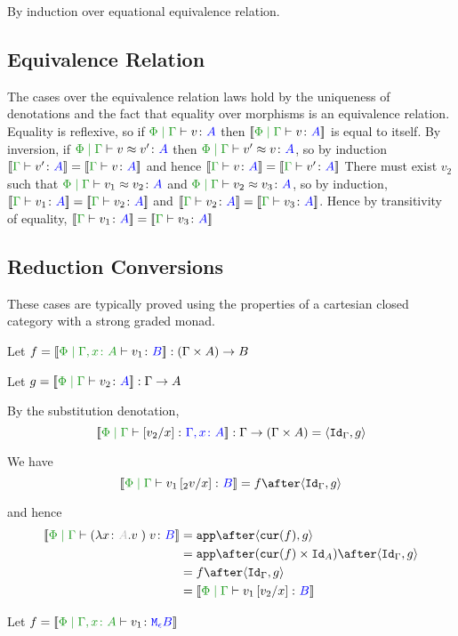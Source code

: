 \documentclass{report}
\begin{document}
By induction over equational equivalence relation.
\subsection{Equivalence Relation}
The cases over the equivalence relation laws hold by the uniqueness of denotations and the fact that equality over morphisms is an equivalence relation.
Equality is reflexive, so if $\gpetyperelation{v}{A}$ then $\deno{\gpetyperelation{v}{A}}$ is equal to itself.
By inversion, if $\gpeberelation{v}{v'}{A}$ then $\gpeberelation{v'}{v}{A}$, so by induction $\gdenoequality{v'}{v}{A}$ and hence $\gdenoequality{v}{v'}{A}$
There must exist $v_2$ such that $\gpeberelation{v_1}{v_2}{A}$ and $\gpeberelation{v_2}{v_3}{A}$, so by induction,
$\gdenoequality{v_1}{v_2}{A}$ and $\gdenoequality{v_2}{v_3}{A}$. Hence by transitivity of equality, $\gdenoequality{v_1}{v_3}{A}$

\subsection{Reduction Conversions}
These cases are typically proved using the properties of a cartesian closed category with a strong graded monad.

    Let $f = \deno{\etyperelation{\P}{\gax}{v_1}{B}}: (\G \times A) \rightarrow B$

    Let $g = \deno{\gpetyperelation{v_2}{A}}: \G \rightarrow A$

    By the substitution denotation, $$\deno{\etyperelation{\P}{\G}{\ssub{x}{v_2}}{\gax}}: \G \rightarrow (\G \times A) = \pr{\idg}{g}$$

    We have $$\deno{\gpetyperelation{v_1\ssub{x}{_2v}}{B}} = f \after \pr{\idg}{g}$$

    and hence
    \begin{equation}
        \begin{split}
            \deno{\gpetyperelation{\apply{(\lam{x}{A}{v})}{v}}{B}} & = \app\after\pr{\cur{f}}{g} \\
            & = \app\after(\cur{f}\times\Id{A})\after\pr{\idg}{g}\\
            & = f \after \pr{\idg}{g} \\
            & = \deno{\gpetyperelation{v_1\ssub{x}{v_2}}{B}}  
        \end{split}
    \end{equation}
   

Let $f = \deno{\etyperelation{\P}{\gax}{v_1}{\meb}}$
\end{document}
